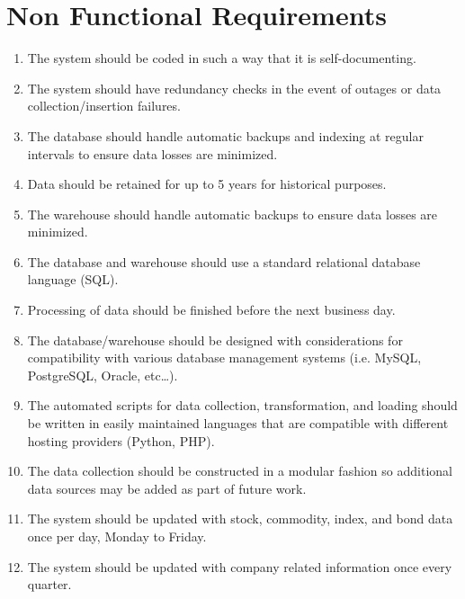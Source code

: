 \section{Non Functional Requirements}
\begin{enumerate}
    \item The system should be coded in such a way that it is self-documenting.
    \item The system should have redundancy checks in the event of outages or data collection/insertion failures.
    \item The database should handle automatic backups and indexing at regular intervals to ensure data losses are minimized.
    \item Data should be retained for up to 5 years for historical purposes.
    \item The warehouse should handle automatic backups to ensure data losses are minimized.
    \item The database and warehouse should use a standard relational database language (SQL).
    \item Processing of data should be finished before the next business day.
    \item The database/warehouse should be designed with considerations for compatibility with various database management systems (i.e. MySQL, PostgreSQL, Oracle, etc…).
    \item The automated scripts for data collection, transformation, and loading should be written in easily maintained languages that are compatible with different hosting providers (Python, PHP).
    \item The data collection should be constructed in a modular fashion so additional data sources may be added as part of future work.
    \item The system should be updated with stock, commodity, index, and bond data once per day, Monday to Friday.
    \item The system should be updated with company related information once every quarter.
\end{enumerate}
